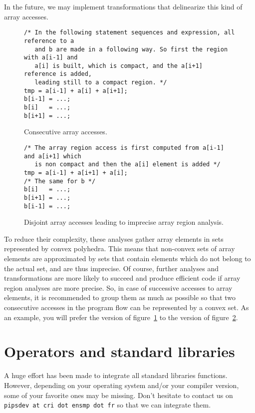 \documentclass[a4paper]{article}
\begin{document}
In the future, we may implement transformations that delinearize this kind
of array accesses.

\begin{figure}
  \centering
  \begin{lstlisting}
/* In the following statement sequences and expression, all reference to a
   and b are made in a following way. So first the region with a[i-1] and
   a[i] is built, which is compact, and the a[i+1] reference is added,
   leading still to a compact region. */
tmp = a[i-1] + a[i] + a[i+1];
b[i-1] = ...;
b[i]   = ...;
b[i+1] = ...;
  \end{lstlisting}
  \caption{Consecutive array accesses.}
  \label{fig:consecutive_array_accesses}
\end{figure}

\begin{figure}
  \centering
  \begin{lstlisting}
/* The array region access is first computed from a[i-1] and a[i+1] which
   is non compact and then the a[i] element is added */
tmp = a[i-1] + a[i+1] + a[i];
/* The same for b */
b[i]   = ...;
b[i+1] = ...;
b[i-1] = ...;
  \end{lstlisting}
  \caption{Disjoint array accesses leading to imprecise array region
    analysis.}
  \label{fig:disjoint_array_accesses}
\end{figure}

To reduce their complexity, these analyses gather array elements in
sets represented by convex polyhedra. This means that non-convex sets
of array elements are approximated by sets that contain elements which
do not belong to the actual set, and are thus imprecise. Of course,
further analyses and transformations are more likely to succeed and
produce efficient code if array region analyses are more precise. So,
in case of successive accesses to array elements, it is recommended to
group them as much as possible so that two consecutive accesses in the
program flow can be represented by a convex set. As an example, you
will prefer the version of figure~\ref{fig:consecutive_array_accesses}
to the version of figure~\ref{fig:disjoint_array_accesses}.




\section{Operators and standard libraries}
\label{sec:operators_and_standard_libraries}

A huge effort has been made to integrate all standard libraries
functions. However, depending on your operating system and/or your
compiler version, some of your favorite ones may be missing. Don't
hesitate to contact us on \texttt{pipsdev at cri dot ensmp dot fr} so
that we can integrate them.
\end{document}

